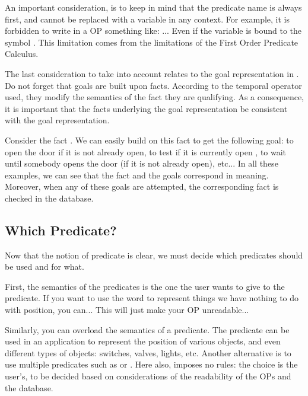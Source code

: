 An important consideration, is to keep in mind that the predicate name is
always first, and cannot be replaced with a variable in any context. For
example, it is forbidden to write in a OP something like: ... Even if the variable  is bound to the symbol .
This limitation comes from the limitations of the First Order Predicate
Calculus.

The last consideration to take into account relates to the goal
representation in \COPRS{}. Do not forget that goals are built upon facts.
According to the temporal operator used, they modify the semantics of the
fact they are qualifying. As a consequence, it is important that the
facts underlying the goal representation be consistent with the goal
representation.

Consider the fact .  We can easily
build on this fact to get the following goal:  to open the door if it is not already open,  to test if it is currently open ,  to wait until somebody opens the door (if it is not
already open), etc... In all these examples, we can see that the fact and
the goals correspond in meaning. Moreover, when any
of these goals are attempted, the corresponding fact is checked in the
database.

\subsection{Which Predicate?}

Now that the notion of predicate is clear, we must
decide which predicates should be used and for what.

First, the semantics of the predicates is the one the user wants to give
to the predicate. If you want to use the word  to
represent things we have nothing to do with position, you can... This will
just make your OP unreadable...

Similarly, you can overload the semantics of a predicate. The predicate
 can be used in an application to represent the position
of various objects, and even different types of objects: switches,
valves, lights, etc. Another alternative is to use multiple predicates such as
 or . Here also, \COPRS{} imposes no
rules: the choice is the user's, to be decided based on considerations of the readability of the OPs and the database.

